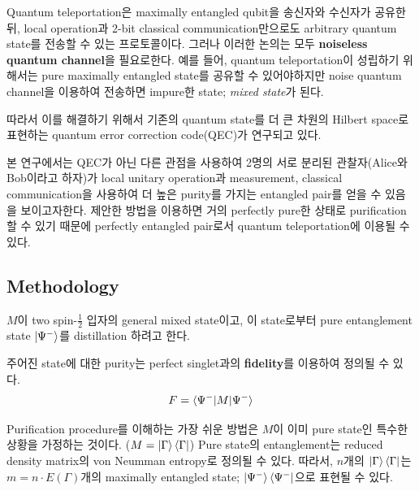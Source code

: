 \documentclass[
]{kaohandt}
\begin{document}
Quantum teleportation은 maximally entangled qubit을 송신자와 수신자가 공유한 뒤, local operation과 2-bit classical communication만으로도 arbitrary quantum state를 전송할 수 있는 프로토콜이다.
그러나 이러한 논의는 모두 \textbf{noiseless quantum channel}을 필요로한다. 예를 들어, quantum teleportation이 성립하기 위해서는 pure maximally entangled state를 공유할 수 있어야하지만 noise quantum channel을 이용하여 전송하면 impure한 state; \textit{mixed state}가 된다.

따라서 이를 해결하기 위해서 기존의 quantum state를 더 큰 차원의 Hilbert space로 표현하는 quantum error correction code(QEC)가 연구되고 있다. 

본 연구에서는 QEC가 아닌 다른 관점을 사용하여 2명의 서로 분리된 관찰자(Alice와 Bob이라고 하자)가 local unitary operation과 measurement, classical communication을 사용하여 더 높은 purity를 가지는 entangled pair를 얻을 수 있음을 보이고자한다. 
제안한 방법을 이용하면 거의 perfectly pure한 상태로 purification 할 수 있기 때문에 perfectly entangled pair로서 quantum teleportation에 이용될 수 있다.

\subsection{Methodology}
$M$이 two spin-$\frac{1}{2}$ 입자의 general mixed state이고, 이 state로부터 pure entanglement state $\ket{\Psi^-}$를 distillation 하려고 한다.

주어진 state에 대한 purity는 perfect singlet과의 \textbf{fidelity}를 이용하여 정의될 수 있다. 
\begin{equation}
    F = \braket{\Psi^- | M | \Psi^-}
\end{equation}

Purification procedure를 이해하는 가장 쉬운 방법은 $M$이 이미 pure state인 특수한 상황을 가정하는 것이다. ($M = \ket{\Gamma} \bra{\Gamma}$)
Pure state의 entanglement는 reduced density matrix의 von Neumman entropy로 정의될 수 있다. 따라서, $n$개의 $\ket{\Gamma} \bra{\Gamma}$는 $m = n \cdot E(\Gamma)$개의 maximally entangled state; $\ket{\Psi^-}\bra{\Psi^-}$으로 표현될 수 있다. 
\end{document}
